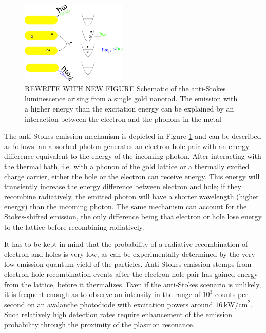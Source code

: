 \documentclass[journal=nalefd,manuscript=letter]{achemso}
\newcommand{\pwr}{\ensuremath{\,\textrm{kW/cm}^2}}
\begin{document}
\begin{figure}[htp]
\centering
	\includegraphics[width=0.45\textwidth]{Figures/01_Scheme/luminescence_all_AS.png}
	\caption{REWRITE WITH NEW FIGURE Schematic of the anti-Stokes luminescence arising from a single gold
	nanorod. The emission with a higher energy than the excitation energy can be
	explained by an interaction between the electron and the phonons in the metal}
	\label{fig:anti-Stokes-process}
\end{figure}

The anti-Stokes emission mechanism\cite{He2015} is depicted in Figure
\ref{fig:anti-Stokes-process} and can be described as follows: an absorbed
photon generates an electron-hole pair with an energy difference equivalent to
the energy of the incoming photon. After interacting with the thermal bath, i.e.
with a phonon of the gold lattice\cite{Lin2008} or a thermally excited charge carrier, either the hole or the electron can receive energy.
This energy will transiently increase the energy difference between electron
and hole; if they recombine radiatively, the emitted photon will have a shorter
wavelength (higher energy) than the incoming photon\cite{Huang2014}. The same
mechanism can account for the Stokes-shifted emission, the only
difference being that electron or hole lose energy to the lattice before
recombining radiatively.

It has to be kept in mind that the probability of a radiative recombination of
electron and holes is very low, as can be experimentally determined by the very low
emission quantum yield of the particles. Anti-Stokes emission stemps from electron-hole
recombination events after the electron-hole pair has gained energy from the lattice, before it thermalizes.
Even if the anti-Stokes scenario is unlikely, it is frequent enough as to
observe an intensity in the range of $10^3$ counts per second on an avalanche
photodiode with excitation powers around $16\pwr$. Such relatively high detection rates require
enhancement of the emission probability through the proximity of the plasmon
resonance\cite{Neupane2013}.
\end{document}
